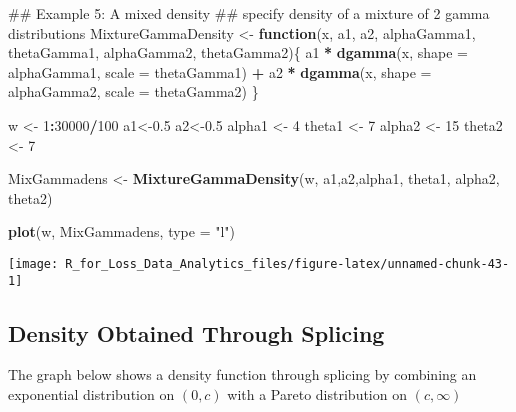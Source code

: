 \documentclass[]{book}
\newenvironment{Shaded}{\begin{snugshade}}{\end{snugshade}}
\newcommand{\KeywordTok}[1]{\textcolor[rgb]{0.13,0.29,0.53}{\textbf{#1}}}
\newcommand{\DataTypeTok}[1]{\textcolor[rgb]{0.13,0.29,0.53}{#1}}
\newcommand{\DecValTok}[1]{\textcolor[rgb]{0.00,0.00,0.81}{#1}}
\newcommand{\FloatTok}[1]{\textcolor[rgb]{0.00,0.00,0.81}{#1}}
\newcommand{\StringTok}[1]{\textcolor[rgb]{0.31,0.60,0.02}{#1}}
\newcommand{\ControlFlowTok}[1]{\textcolor[rgb]{0.13,0.29,0.53}{\textbf{#1}}}
\newcommand{\OperatorTok}[1]{\textcolor[rgb]{0.81,0.36,0.00}{\textbf{#1}}}
\newcommand{\NormalTok}[1]{#1}
\theoremstyle{definition}
\theoremstyle{definition}
\theoremstyle{definition}
\theoremstyle{remark}
\begin{document}
\begin{Shaded}
\begin{Highlighting}[]
\NormalTok{## Example 5: A mixed density}
\NormalTok{## specify density of a mixture of 2 gamma distributions}
\NormalTok{MixtureGammaDensity <-}\StringTok{ }\ControlFlowTok{function}\NormalTok{(x, a1, a2, alphaGamma1, thetaGamma1, alphaGamma2, thetaGamma2)\{}
\NormalTok{  a1 }\OperatorTok{*}\StringTok{ }\KeywordTok{dgamma}\NormalTok{(x, }\DataTypeTok{shape =}\NormalTok{ alphaGamma1, }\DataTypeTok{scale =}\NormalTok{ thetaGamma1) }\OperatorTok{+}\StringTok{ }\NormalTok{a2 }\OperatorTok{*}\StringTok{ }\KeywordTok{dgamma}\NormalTok{(x, }\DataTypeTok{shape =}\NormalTok{ alphaGamma2, }\DataTypeTok{scale =}\NormalTok{ thetaGamma2)}
\NormalTok{\}}

\NormalTok{w <-}\StringTok{ }\DecValTok{1}\OperatorTok{:}\DecValTok{30000}\OperatorTok{/}\DecValTok{100}
\NormalTok{a1<-}\FloatTok{0.5}
\NormalTok{a2<-}\FloatTok{0.5}
\NormalTok{alpha1 <-}\StringTok{ }\DecValTok{4}
\NormalTok{theta1 <-}\StringTok{ }\DecValTok{7}
\NormalTok{alpha2 <-}\StringTok{ }\DecValTok{15}
\NormalTok{theta2 <-}\StringTok{ }\DecValTok{7}

\NormalTok{MixGammadens <-}\StringTok{ }\KeywordTok{MixtureGammaDensity}\NormalTok{(w, a1,a2,alpha1, theta1, alpha2, theta2)}

\KeywordTok{plot}\NormalTok{(w, MixGammadens, }\DataTypeTok{type =} \StringTok{"l"}\NormalTok{)}
\end{Highlighting}
\end{Shaded}

\begin{center}\texttt{[image: R\_for\_Loss\_Data\_Analytics\_files/figure-latex/unnamed-chunk-43-1]} \end{center}

\subsection{Density Obtained Through
Splicing}\label{density-obtained-through-splicing}

The graph below shows a density function through splicing by combining
an exponential distribution on \((0,c)\) with a Pareto distribution on
\((c,\infty)\)
\end{document}
